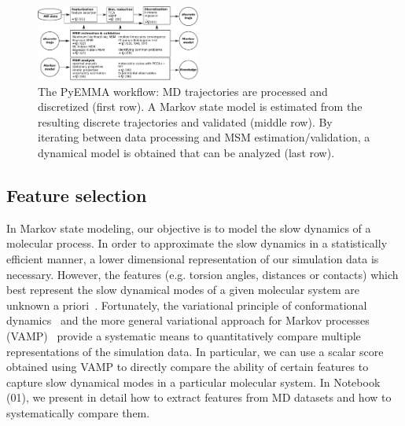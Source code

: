\documentclass[9pt,tutorial]{livecoms}
\begin{document}
\begin{figure}[bt]
\includegraphics[width=0.48\textwidth]{figure_2}
\caption{The PyEMMA workflow: MD trajectories are processed and discretized (first row).
A Markov state model is estimated from the resulting discrete trajectories and validated (middle row).
By iterating between data processing and MSM estimation/validation,
a dynamical model is obtained that can be analyzed (last row).}
\label{fig:workflowchart}
\end{figure}

\subsection{Feature selection}

In Markov state modeling, our objective is to model the slow dynamics of a molecular process.
In order to approximate the slow dynamics in a statistically efficient manner,
a lower dimensional representation of our simulation data is necessary.
However, the features (e.g. torsion angles, distances or contacts) which best represent the slow dynamical modes of a given molecular system are unknown a priori~\cite{NoeClementiReview}.
Fortunately, the variational principle of conformational dynamics~\cite{noe-vac,nueske-vamk}
and the more general variational approach for Markov processes (VAMP)~\cite{vamp-preprint}
provide a systematic means to quantitatively compare multiple representations of the simulation data.
In particular, we can use a scalar score obtained using VAMP to directly compare the ability of certain features to capture slow dynamical modes in a particular molecular system.
In Notebook (01), we present in detail how to extract features from MD datasets and how to systematically compare them.
\end{document}
